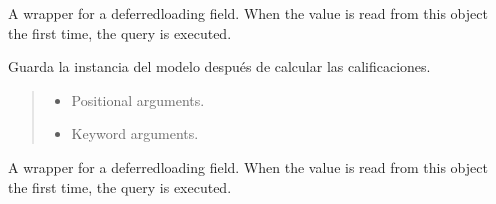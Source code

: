 \documentclass[letterpaper,10pt,spanish]{sphinxmanual}
\begin{document}
\begin{fulllineitems}
\begin{fulllineitems}
\end{fulllineitems}



\begin{fulllineitems}

\pysigstartsignatures
{}
\pysigstopsignatures
\sphinxAtStartPar
A wrapper for a deferred\sphinxhyphen{}loading field. When the value is read from this
object the first time, the query is executed.

\end{fulllineitems}



\begin{fulllineitems}

\pysigstartsignatures
{}
\pysigstopsignatures
\sphinxAtStartPar
Guarda la instancia del modelo después de calcular las calificaciones.
\begin{quote}\begin{description}
\begin{itemize}
\item {} 
\sphinxAtStartPar
{} \textendash{} Positional arguments.

\item {} 
\sphinxAtStartPar
{} \textendash{} Keyword arguments.

\end{itemize}

\end{description}\end{quote}

\end{fulllineitems}



\begin{fulllineitems}

\pysigstartsignatures
{}
\pysigstopsignatures
\sphinxAtStartPar
A wrapper for a deferred\sphinxhyphen{}loading field. When the value is read from this
object the first time, the query is executed.

\end{fulllineitems}



\begin{fulllineitems}


\end{fulllineitems}
\end{fulllineitems}
\end{document}

